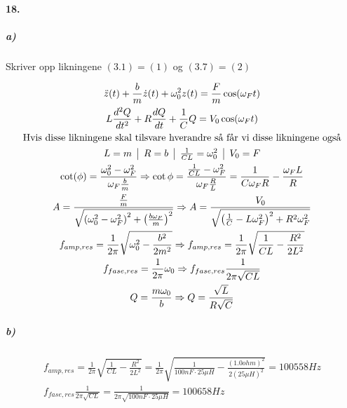 \documentclass[11pt, A4paper,norsk]{article}
\begin{document}
		\paragraph{18.}
			\subparagraph{a)}
				\begin{flushleft}
Skriver opp likningene $(3.1) = (1)$ og $(3.7) = (2)$
				\end{flushleft}
				\begin{gather}
\ddot{z}(t) + \frac{b}{m} \dot{z}(t) + \omega_0^2 z(t) = \frac{F}{m} \cos (\omega_F t) \\
L \frac{d^2 Q}{dt^2} + R \frac{dQ}{dt} + \frac{1}{C} Q = V_0 \cos(\omega_F t) \\
\text{Hvis disse likningene skal tilsvare hverandre så får vi disse likningene også} \nonumber \\
\begin{tabular} { c|c|c|c}
$L = m$ & $R = b$ & $\frac{1}{CL} = \omega_0^2$ & $V_0 = F$
\end{tabular} \\
\cot(\phi) = \frac{\omega_0^2 - \omega_F^2}{\omega_F \frac{b}{m}} \Rightarrow \cot \phi = \frac{\frac{1}{CL} - \omega_F^2}{\omega_F \frac{R}{L}} = \frac{1}{C \omega_F R} - \frac{\omega_F L}{R} \\
A = \frac{\frac{F}{m}}{\sqrt{\left( \omega_0^2 - \omega_F^2 \right)^2 + \left( \frac{b \omega_F}{m} \right)^2}} \Rightarrow A = \frac{V_0}{\sqrt{\left( \frac{1}{C} - L\omega_F^2 \right)^2 + R^2 \omega_F^2}} \\
f_{amp, res} = \frac{1}{2 \pi} \sqrt{\omega_0^2 - \frac{b^2}{2m^2}} \Rightarrow f_{amp, res} = \frac{1}{2 \pi} \sqrt{\frac{1}{CL} - \frac{R^2}{2L^2}} \\
f_{fase, res} = \frac{1}{2 \pi} \omega_0 \Rightarrow f_{fase, res} \frac{1}{2 \pi \sqrt{CL}} \\
Q = \frac{m \omega_0}{b} \Rightarrow Q = \frac{\sqrt{L}}{R\sqrt{C}}
				\end{gather}











			\subparagraph{b)}
				\begin{gather*}
f_{amp, res} = \frac{1}{2 \pi} \sqrt{\frac{1}{CL} - \frac{R^2}{2L^2}} = \frac{1}{2 \pi} \sqrt{\frac{1}{100 nF \cdot 25 \mu H} - \frac{(1.0 ohm)^2}{2 (25 \mu H)^2}} = 100558 Hz \\
f_{fase, res} \frac{1}{2 \pi \sqrt{CL}} = \frac{1}{2 \pi \sqrt{100 nF \cdot 25 \mu H}} = 100658 Hz
				\end{gather*}
\end{document}
